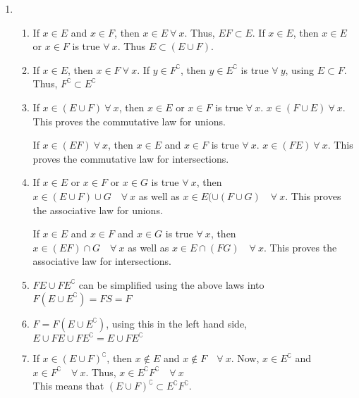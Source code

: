 \begin{enumerate}
	\item \begin{enumerate}
		
		\item If $ x \in E $ and $ x \in F $, then $ x \in E \ \forall\  x $. Thus, $ EF \subset E $.
		If $ x \in E $, then $ x \in E $ or $ x \in F $ is true $ \forall \ x $. Thus $ E \subset (E \cup F) $.
		
		\item If $ x \in E $, then $ x \in F \ \forall \ x$.
		If  $ y \in F^\complement $, then $ y \in E^\complement $ is true $ \forall \ y $, using $ E \subset F $. Thus, $ F^\complement \subset E^\complement $ \\
		
		\item If $ x \in (E \cup F) \ \forall\ x$, then $ x \in E $ or $ x \in F $ is true $ \forall \ x $.
		$ x \in (F \cup E) \ \forall\ x$. This proves the commutative law for unions.
		
		If $ x \in (E F) \ \forall\ x$, then $ x \in E $ and $ x \in F $ is true $ \forall \ x $.
		$ x \in (F  E) \ \forall\ x$. This proves the commutative law for intersections.
		
		\item If $ x \in E $ or $ x \in F $ or $ x \in G $ is true $ \forall \ x $, then \\
		$ x \in (E \cup F) \cup G \quad \forall \ x$ as well as $ x \in E(\cup (F \cup G) \quad \forall \ x$.
		This proves the associative law for unions.
		
		If $ x \in E $ and $ x \in F $ and $ x \in G $ is true $ \forall \ x $, then \\
		$ x \in (E F) \cap G \quad \forall \ x$ as well as $ x \in E \cap (F G) \quad \forall \ x$.
		This proves the associative law for intersections.
		
		\item $ FE \cup FE^\complement $ can be simplified using the above laws into \\
		$ F (E \cup E^\complement) = F S = F$ \\
		
		\item $ F = F (E \cup E^\complement) $, using this in the left hand side,
		$ E \cup FE \cup FE^\complement = E \cup F E^\complement$ \\
		
		\item If $ x \in (E \cup F)^\complement $, then $ x \notin E $ and $ x \notin F  \quad \forall \ x$.
		Now, $ x \in E^\complement $ and $ x \in F^\complement  \quad \forall \ x$. Thus, $ x \in E^\complement F^\complement \quad \forall \ x $ \\
		This means that $ (E \cup F)^\complement \subset E^\complement F^\complement $.
		

\end{enumerate}
\end{enumerate}
